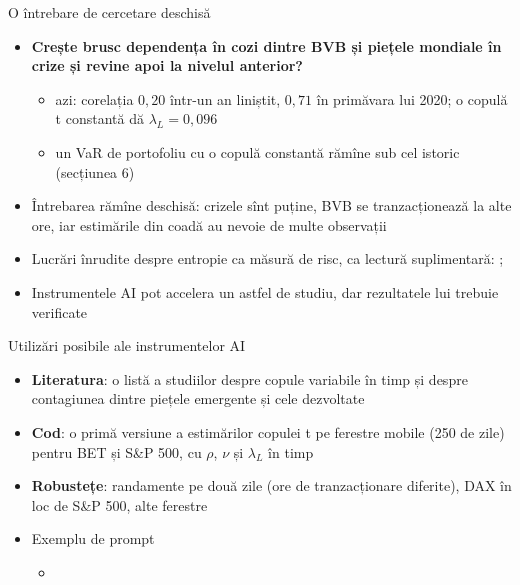 \begin{frame}{O întrebare de cercetare deschisă}
\itemsize{\small}
\begin{itemize}
    \item \textbf{Crește brusc dependența în cozi dintre BVB și piețele mondiale în crize și revine apoi la nivelul anterior?}
    \begin{itemize}
        \item azi: corelația $0{,}20$ într-un an liniștit, $0{,}71$ în primăvara lui 2020; o copulă t constantă dă $\lambda_L = 0{,}096$
        \item un VaR de portofoliu cu o copulă constantă rămîne sub cel istoric (secțiunea 6)
    \end{itemize}
    \item Întrebarea rămîne deschisă: crizele sînt puține, BVB se tranzacționează la alte ore, iar estimările din coadă au nevoie de multe observații
    \item Lucrări înrudite despre entropie ca măsură de risc, ca lectură suplimentară: ; 
    \item Instrumentele AI pot accelera un astfel de studiu, dar rezultatele lui trebuie verificate 
\end{itemize}
\end{frame}

\begin{frame}{Utilizări posibile ale instrumentelor AI}
\itemsize{\small}
\begin{itemize}
    \item \textbf{Literatura}: o listă a studiilor despre copule variabile în timp și despre contagiunea dintre piețele emergente și cele dezvoltate
    \item \textbf{Cod}: o primă versiune a estimărilor copulei t pe ferestre mobile (250 de zile) pentru BET și S\&P 500, cu $\rho$, $\nu$ și $\lambda_L$ în timp
    \item \textbf{Robustețe}: randamente pe două zile (ore de tranzacționare diferite), DAX în loc de S\&P 500, alte ferestre
    \item Exemplu de prompt
    \begin{itemize}
        \item {}
    \end{itemize}
\end{itemize}
\end{frame}

